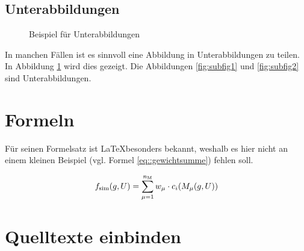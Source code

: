 \subsection{Unterabbildungen}

\begin{figure}%
  \centering
   \hfill
   \caption{Beispiel für Unterabbildungen}
   \label{fig:subfigexample}
\end{figure}


In manchen Fällen ist es sinnvoll eine Abbildung in Unterabbildungen zu teilen.
In Abbildung \ref{fig:subfigexample} wird dies gezeigt.
Die Abbildungen \ref{fig:subfig1} und \ref{fig:subfig2} sind Unterabbildungen.

\section{Formeln}

Für seinen Formelsatz ist \LaTeX besonders bekannt, weshalb es hier nicht an einem kleinen Beispiel (vgl. Formel \ref{eq::gewichtsumme}) fehlen soll.

\begin{equation}
f_\text{sim}(g,U)=\sum\limits^{n_\text{M}}_{\mu=1} w_\mu\cdot c_i( M_\mu(g,U)) \label{eq::gewichtsumme}
\end{equation}

\section{Quelltexte einbinden}

